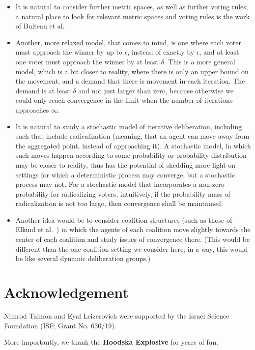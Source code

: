 \documentclass[runningheads,envcountsame]{llncs}
\begin{document}
\begin{itemize}

\item
It is natural to consider further metric spaces, as well as further voting rules; a natural place to look for relevant metric spaces and voting rules is the work of Bulteau et al.~\cite{bulteau2021aggregation}.

\item
Another, more relaxed model, that comes to mind, is one where each voter must approach the winner by up to $\epsilon$, instead of exactly by $\epsilon$, and at least one voter must approach the winner by at least $\delta$.
%
This is a more general model, which is a bit closer to reality, where there is only an upper bound on the movement, and a demand that there is movement in each iteration. 
%
The demand is at least $\delta$ and not just larger than zero, because otherwise we could only reach convergence in the limit when the number of iterations approaches $\infty$.
\item
It is natural to study a stochastic model of iterative deliberation, including such that include radicalization (meaning, that an agent can move away from the aggregated point, instead of approaching it).
%
A stochastic model, in which such moves happen according to some probability or probability distribution may be closer to reality, thus has the potential of shedding more light on settings for which a deterministic process may converge, but a stochastic process may not.
%
For a stochastic model that incorporates a non-zero probability for radicalizing voters, intuitively, if the probability mass of radicalization is not too large, then convergence shall be maintained. 

\item
Another idea would be to consider coalition structures (such as those of Elkind et al.~\cite{elkind2021united}) in which the agents of each coalition move slightly towards the center of each coalition and study issues of convergence there. (This would be different than the one-coalition setting we consider here; in a way, this would be like several dynamic deliberation groups.)

\end{itemize}


\section*{Acknowledgement}

Nimrod Talmon and Eyal Leizerovich were supported by the Israel Science Foundation (ISF; Grant No. 630/19).

More importantly, we thank the \textbf{Hoodska Explosive} for years of fun.
\\
\\
\\





\appendix



\end{document}
